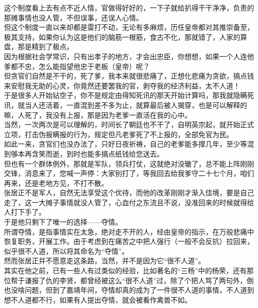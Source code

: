 \begin{multicols}{\theparacolNo}
这个制度看上去有点不近人情，官做得好好的，一下子就给扒得干干净净，负责的那摊事情也没人管，不但误事，还误人心情。\\

但这个制度一直以来却都是雷打不动，无论有多麻烦，历任皇帝都对其推崇备至，极其支持，如果你认为这是他们的脑筋一根筋，食古不化，那就错了，人家的算盘，那是精到了极点。\\

因为根据社会学常识，只有出孝子的地方，才会出忠臣，你想想，如果一个人连他爹都不忠，怎么能指望他忠于老板（皇帝）呢？\\

但贪官们自然是不干的，死了爹，我本来就很悲痛了，正想化悲痛为贪欲，搞点钱来安慰我无助的心灵，你竟然还要罢我的官，剥夺我的经济利益，太不人道！\\

于是很多人开始钻空子，你不是规定由得知死讯的那天开始计算吗，那我就隐瞒死讯，就当人还活着，一直混到差不多为止，就算最后被人揭穿，也是可以解释的嘛，人死了，我没有上报，那是因为老爹一直活在我的心中。\\

当然，一次两次是可以理解的，时间长了朝廷也不干了，自明英宗起，就开始正式立项，打击伪报瞒报的行为，规定但凡老爹死了不上报的，全部免官为民。\\

如此一来，贪官们也没办法了，只好日夜祈祷，自己的老爹能多撑几年，至少等混到够本再含笑而逝，到时也能多搞点纸钱给您送去。\\

但也有一个群体例外，那就是军队，领兵打仗，这就绝对没辙了，总不能上阵刚刚交锋，消息来了，您喊一声停：大家别打了，等我回去给我爹守二十七个月，咱们再来，还是老地方见，不打不散。\\

张居正不是军人，自然无法享受这个优待，而他的改革刚刚才渐入佳境，要是自己走了，这一大摊子事情就没人管了，心血付之东流且不说，没准回来的时候就得给人打下手了。\\

于是他只剩下了唯一的选择——夺情。\\

所谓夺情，是指事情实在太急，绝对走不开的人，经由皇帝的指示，在万般悲痛中恢复职务，开展工作。由于考虑到在痛苦之中把人强行（一般不会反抗）拉回来，似乎很不人道，所以将其命名为“夺情”。\\

然而张居正并不愿意走这条路，当然，并不是因为它“很不人道”。\\

其实在他之前，已有一些人有过类似的经验，比如著名的“三杨”中的杨荣，还有那位帮于谦报了仇的李贤，都曾经被这么“很不人道”过，除了个把人骂了两句外，倒也没啥问题，但到了嘉靖年间，夺情却真的成为了一件很不人道的事情，不人道到想不人道都不行，如果有人提出夺情，就会被看作禽兽不如。\\


\end{multicols}
